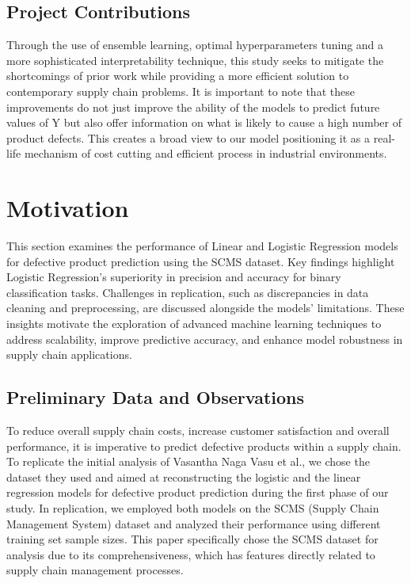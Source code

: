\documentclass[conference]{IEEEtran}
\begin{document}
\subsection{Project Contributions}
Through the use of ensemble learning, optimal hyperparameters tuning and a more sophisticated interpretability technique, this study seeks to mitigate the shortcomings of prior work while providing a more efficient solution to contemporary supply chain problems. It is important to note that these improvements do not just improve the ability of the models to predict future values of Y but also offer information on what is likely to cause a high number of product defects. This creates a broad view to our model positioning it as a real-life mechanism of cost cutting and efficient process in industrial environments.


\section{Motivation}

This section examines the performance of Linear and Logistic Regression models for defective product prediction using the SCMS dataset. Key findings highlight Logistic Regression’s superiority in precision and accuracy for binary classification tasks. Challenges in replication, such as discrepancies in data cleaning and preprocessing, are discussed alongside the models' limitations. These insights motivate the exploration of advanced machine learning techniques to address scalability, improve predictive accuracy, and enhance model robustness in supply chain applications.

\subsection{Preliminary Data and Observations}

To reduce overall supply chain costs, increase customer satisfaction and overall performance, it is imperative to predict defective products within a supply chain. To replicate the initial analysis of Vasantha Naga Vasu et al., we chose the dataset they used and aimed at reconstructing the logistic and the linear regression models for defective product prediction during the first phase of our study. In replication, we employed both models on the SCMS (Supply Chain Management System) dataset and analyzed their performance using different training set sample sizes. This paper specifically chose the SCMS dataset for analysis due to its comprehensiveness, which has features directly related to supply chain management processes.
\end{document}
